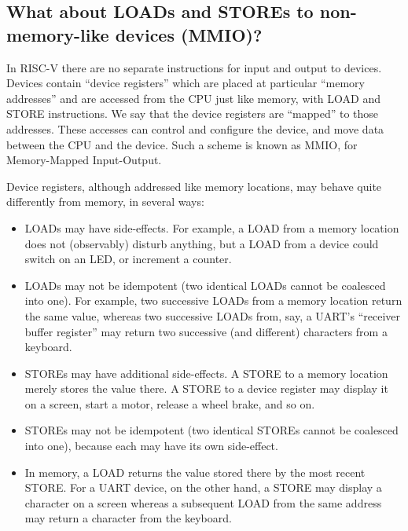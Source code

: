 \subsection{What about LOADs and STOREs to non-memory-like devices (MMIO)?}

\label{Sec_DMem_MMIO}


In RISC-V there are no separate instructions for input and output to
devices.  Devices contain ``device registers'' which are placed at
particular ``memory addresses'' and are accessed from the CPU just
like memory, with LOAD and STORE instructions.  We say that the device
registers are ``mapped'' to those addresses.  These accesses can
control and configure the device, and move data between the CPU and
the device.  Such a scheme is known as MMIO, for Memory-Mapped
Input-Output.

Device registers, although addressed like memory locations, may behave
quite differently from memory, in several ways:

\begin{itemize}

  \item LOADs may have side-effects.  For example, a LOAD from a
    memory location does not (observably) disturb anything, but a LOAD
    from a device could switch on an LED, or increment a counter.

  \item LOADs may not be idempotent (two identical LOADs cannot be
    coalesced into one).  For example, two successive LOADs from a
    memory location return the same value, whereas two successive
    LOADs from, say, a UART's ``receiver buffer register'' may return
    two successive (and different) characters from a keyboard.

  \item STOREs may have additional side-effects.  A STORE to a memory
    location merely stores the value there.  A STORE to a device
    register may display it on a screen, start a motor, release a
    wheel brake, and so on.

  \item STOREs may not be idempotent (two identical STOREs cannot be
    coalesced into one), because each may have its own side-effect.

  \item In memory, a LOAD returns the value stored there by the most
    recent STORE.  For a UART device, on the other hand, a STORE may
    display a character on a screen whereas a subsequent LOAD from the
    same address may return a character from the keyboard.

\end{itemize}

